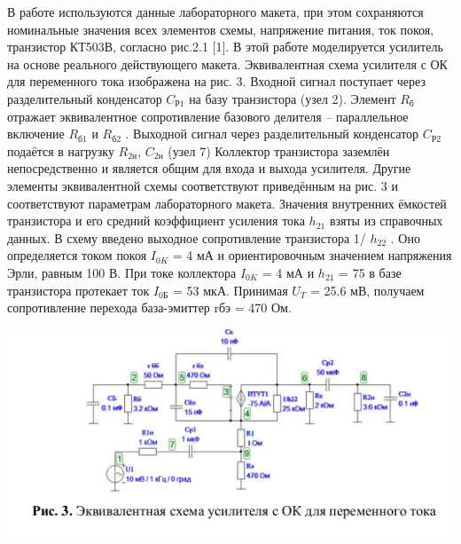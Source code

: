 \documentclass[a4paper,14pt]{extarticle}
\begin{document}
    В работе используются данные лабораторного макета, при этом
    сохраняются номинальные значения всех элементов схемы, напряжение
    питания, ток покоя, транзистор КТ503В, согласно рис.2.1 [1]. В этой работе
    моделируется усилитель на основе реального действующего макета.
    Эквивалентная схема усилителя с ОК для переменного тока изображена на
    рис. 3. Входной сигнал поступает через разделительный конденсатор $C_{\text{Р1}}$ на
    базу транзистора (узел 2). Элемент $R_{\text{б}}$ отражает эквивалентное сопротивление
    базового делителя – параллельное включение $R_{\text{б1}}$ и $R_{\text{б2}}$ . Выходной сигнал через
    разделительный конденсатор $C_{Р2}$ подаётся в нагрузку $R_{\text{2н}}$, $C_{\text{2н}}$ (узел 7)
    Коллектор транзистора заземлён непосредственно и является общим для входа
    и выхода усилителя. Другие элементы эквивалентной схемы соответствуют
    приведённым на рис. 3 и соответствуют параметрам лабораторного макета.
    Значения внутренних ёмкостей транзистора и его средний коэффициент
    усиления тока $h_{21}$ взяты из справочных данных. В схему введено выходное
    сопротивление транзистора 1/ $h_{22}$ . Оно определяется током покоя $I_{0K}$ = 4 мА и
    ориентировочным значением напряжения Эрли, равным 100 В. При токе
    коллектора $I_{0K}$ = 4 мА и $h_{21}$ = 75 в базе транзистора протекает ток $I_{\text{0Б}}$ = 53 мкА.
    Принимая $U_T$ = 25.6 мВ, получаем сопротивление перехода база-эмиттер
    rбэ = 470 Ом.

    \begin{center}
        \includegraphics[scale=0.9]{0.3.png}
    \end{center}
\end{document}
